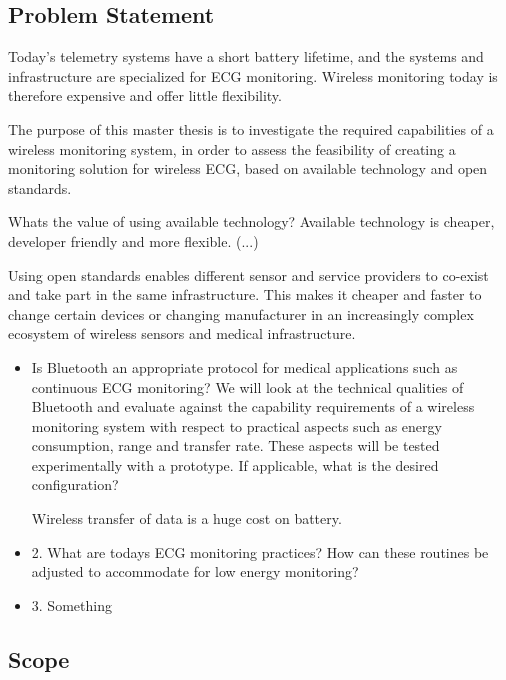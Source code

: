 \subsection{Problem Statement} %
\label{sub:problem_statement}

Today's telemetry systems have a short battery lifetime, and the systems and infrastructure are specialized for ECG monitoring. Wireless monitoring today is therefore expensive and offer little flexibility. 
		
The purpose of this master thesis is to investigate the required capabilities of a wireless monitoring system, in order to assess the feasibility of creating a monitoring solution for wireless ECG, based on available technology and open standards.

Whats the value of using available technology? Available technology is cheaper, developer friendly and more flexible. (...)

Using open standards enables different sensor and service providers to co-exist and take part in the same infrastructure. This makes it cheaper and faster to change certain devices or changing manufacturer in an increasingly complex ecosystem of wireless sensors and medical infrastructure.


\begin{itemize}
\item Is Bluetooth an appropriate protocol for medical applications such as continuous ECG monitoring? We will look at the technical qualities of Bluetooth and evaluate against the capability requirements of a wireless monitoring system with respect to practical aspects such as energy consumption, range and transfer rate. These aspects will be tested experimentally with a prototype. If applicable, what is the desired configuration?

Wireless transfer of data is a huge cost on battery. 

\item 2. What are todays ECG monitoring practices? How can these routines be adjusted to accommodate for low energy monitoring?

\item 3. Something


\end{itemize}

\subsection{Scope} %
\label{sub:scope}

